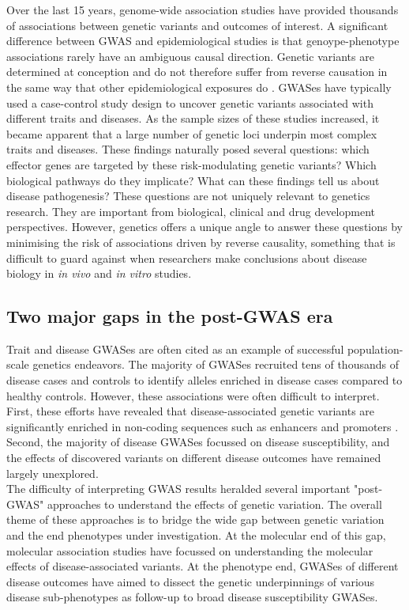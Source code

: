 Over the last 15 years, genome-wide association studies have provided thousands of associations between genetic variants and outcomes of interest. A significant difference between GWAS and epidemiological studies is that genoype-phenotype associations rarely have an ambiguous causal direction. Genetic variants are determined at conception and do not therefore suffer from reverse causation in the same way that other epidemiological exposures do \cite{Smith2007-py}. GWASes have typically used a case-control study design to uncover genetic variants associated with different traits and diseases. As the sample sizes of these studies increased, it became apparent that a large number of genetic loci underpin most complex traits and diseases. These findings naturally posed several questions: which effector genes are targeted by these risk-modulating genetic variants? Which biological pathways do they implicate? What can these findings tell us about disease pathogenesis? These questions are not uniquely relevant to genetics research. They are important from biological, clinical and drug development perspectives. However, genetics offers a unique angle to answer these questions by minimising the risk of associations driven by reverse causality, something that is difficult to guard against when researchers make conclusions about disease biology in \textit{in vivo} and \textit{in vitro} studies. 

\subsection{Two major gaps in the post-GWAS era}
Trait and disease GWASes are often cited as an example of successful population-scale genetics endeavors. The majority of GWASes recruited tens of thousands of disease cases and controls to identify alleles enriched in disease cases compared to healthy controls. However, these associations were often difficult to interpret. First, these efforts have revealed that disease-associated genetic variants are significantly enriched in non-coding sequences such as enhancers and promoters \cite{Ahonen2009-eo,Degner2012-dq,Trynka2013-qs}. Second, the majority of disease GWASes focussed on disease susceptibility, and the effects of discovered variants on different disease outcomes have remained largely unexplored.\\

The difficulty of interpreting GWAS results heralded several important "post-GWAS" approaches to understand the effects of genetic variation. The overall theme of these approaches is to bridge the wide gap between genetic variation and the end phenotypes under investigation. At the molecular end of this gap, molecular association studies have focussed on understanding the molecular effects of disease-associated variants. At the phenotype end, GWASes of different disease outcomes have aimed to dissect the genetic underpinnings of various disease sub-phenotypes as follow-up to broad disease susceptibility GWASes.\\

